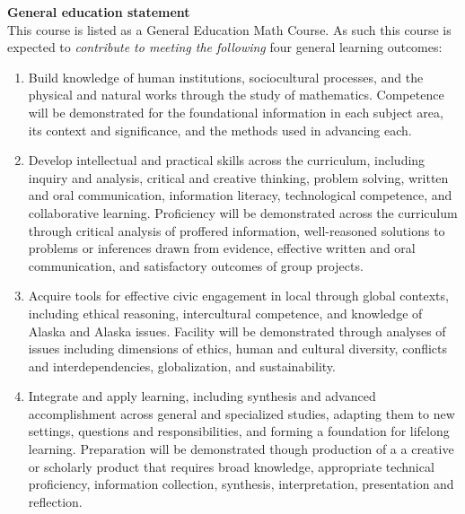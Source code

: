 \documentclass[12pt]{article}
\renewcommand{\emph}[1]{\textsf{\textbf{#1}}}
\newcommand{\localhead}[1]{\par\smallskip\textbf{#1} \smallskip\nobreak\\}%
\def\subheading#1{\localhead{\emph{#1}}}
\begin{document}
\clearpage\newpage

\strut

\vspace{-12pt}

\subheading{General education statement}
This course is listed as a General Education Math Course.  As such this course is expected to \textsl{contribute to meeting the following} four general learning outcomes:

\begin{enumerate}
\item Build knowledge of human institutions, sociocultural processes, and the physical and natural works through the study of mathematics.  Competence will be demonstrated for the foundational information in each subject area, its context and significance, and the methods used in advancing each.

\item Develop intellectual and practical skills across the curriculum, including inquiry and analysis, critical and creative thinking, problem solving, written and oral communication, information literacy, technological competence, and collaborative learning. Proficiency will be demonstrated across the curriculum through critical analysis of proffered information, well-reasoned solutions to problems or inferences drawn from evidence, effective written and oral communication, and satisfactory outcomes of group projects.

\item Acquire tools for effective civic engagement in local through global contexts, including ethical reasoning, intercultural competence, and knowledge of Alaska and Alaska issues.  Facility will be demonstrated through analyses of issues including dimensions of ethics, human and cultural diversity, conflicts and interdependencies, globalization, and sustainability.   

\item Integrate and apply learning, including synthesis and advanced accomplishment across general and specialized studies, adapting them to new settings, questions and responsibilities, and forming a foundation for lifelong learning. Preparation will be demonstrated though production of a a creative or scholarly product that requires broad knowledge, appropriate technical proficiency, information collection, synthesis, interpretation, presentation and reflection.
\end{enumerate}

\newpage
\end{document}
